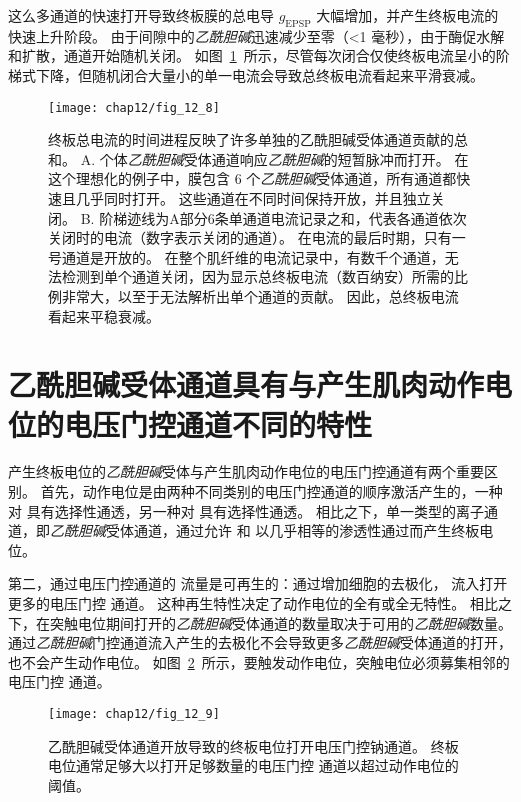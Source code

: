 这么多通道的快速打开导致终板膜的总电导 $ g_{\text{EPSP}} $ 大幅增加，并产生终板电流的快速上升阶段。
由于间隙中的\textit{乙酰胆碱}迅速减少至零（<1 毫秒），由于酶促水解和扩散，通道开始随机关闭。
如图~\ref{fig:12_8}~所示，尽管每次闭合仅使终板电流呈小的阶梯式下降，但随机闭合大量小的单一电流会导致总终板电流看起来平滑衰减。


\begin{figure}[htbp]
	\centering
	\texttt{[image: chap12/fig\_12\_8]}
	\caption{终板总电流的时间进程反映了许多单独的乙酰胆碱受体通道贡献的总和\cite{colquhoun1981fast}。
		A. 个体\textit{乙酰胆碱}受体通道响应\textit{乙酰胆碱}的短暂脉冲而打开。
		在这个理想化的例子中，膜包含 6 个\textit{乙酰胆碱}受体通道，所有通道都快速且几乎同时打开。
		这些通道在不同时间保持开放，并且独立关闭。
		B. 阶梯迹线为A部分6条单通道电流记录之和，代表各通道依次关闭时的电流（数字表示关闭的通道）。
		在电流的最后时期，只有一号通道是开放的。
		在整个肌纤维的电流记录中，有数千个通道，无法检测到单个通道关闭，因为显示总终板电流（数百纳安）所需的比例非常大，以至于无法解析出单个通道的贡献。
		因此，总终板电流看起来平稳衰减。}
	\label{fig:12_8}
\end{figure}



\section{乙酰胆碱受体通道具有与产生肌肉动作电位的电压门控通道不同的特性}

产生终板电位的\textit{乙酰胆碱}受体与产生肌肉动作电位的电压门控通道有两个重要区别。
首先，动作电位是由两种不同类别的电压门控通道的顺序激活产生的，一种对  具有选择性通透，另一种对  具有选择性通透。
相比之下，单一类型的离子通道，即\textit{乙酰胆碱}受体通道，通过允许  和  以几乎相等的渗透性通过而产生终板电位。


第二，通过电压门控通道的  流量是可再生的：通过增加细胞的去极化， 流入打开更多的电压门控  通道。
这种再生特性决定了动作电位的全有或全无特性。
相比之下，在突触电位期间打开的\textit{乙酰胆碱}受体通道的数量取决于可用的\textit{乙酰胆碱}数量。
 通过\textit{乙酰胆碱}门控通道流入产生的去极化不会导致更多\textit{乙酰胆碱}受体通道的打开，也不会产生动作电位。
如图~\ref{fig:12_9}~所示，要触发动作电位，突触电位必须募集相邻的电压门控  通道。


\begin{figure}[htbp]
	\centering
	\texttt{[image: chap12/fig\_12\_9]}
	\caption{乙酰胆碱受体通道开放导致的终板电位打开电压门控钠通道。
		终板电位通常足够大以打开足够数量的电压门控  通道以超过动作电位的阈值\cite{alberts2017molecular}。}
	\label{fig:12_9}
\end{figure}


